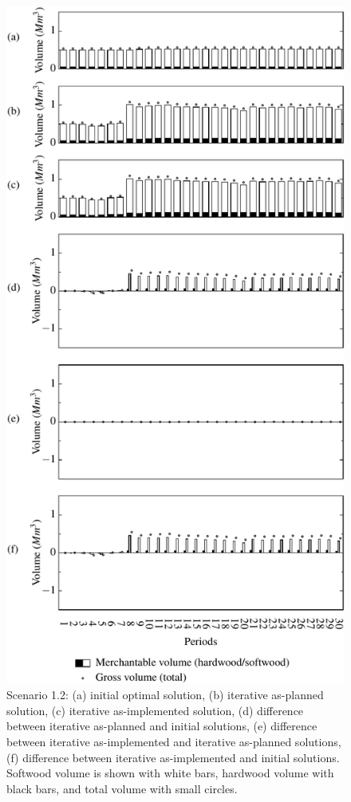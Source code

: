 \begin{figure}[ht!]
  \caption{Scenario 1.2: (a) initial optimal solution, (b) iterative
    as-planned solution, (c) iterative as-implemented solution, (d)
    difference between iterative as-planned and initial solutions, (e)
    difference between iterative as-implemented and iterative
    as-planned solutions, (f) difference between iterative
    as-implemented and initial solutions. Softwood volume is shown
    with white bars, hardwood volume with black bars, and total volume
    with small circles.}
  \label{fig:scenario1.2}
  \medskip
  \centering
  \includegraphics[width=0.60\columnwidth]{images/s2-1b}
\end{figure}

